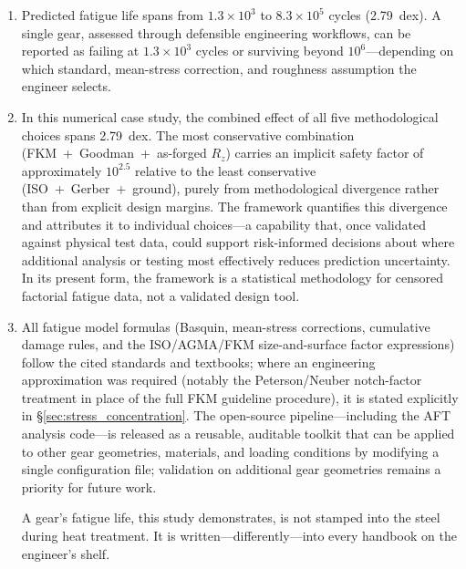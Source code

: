 \documentclass[twocolumn,12pt,a4paper]{article}
\begin{document}
\begin{enumerate}
        constant-amplitude loading; this figure must not be extrapolated
        to variable-amplitude spectra, where sequence effects and
        damage-rule differences could produce substantially larger
        divergence.
  \item Predicted fatigue life spans from $1.3\times10^3$ to
        $8.3\times10^5$ cycles (2.79~dex). A single gear, assessed
        through defensible engineering workflows, can be reported as
        failing at $1.3\times10^3$ cycles or surviving beyond $10^6$---depending on
        which standard, mean-stress correction, and roughness
        assumption the engineer selects.
  \item In this numerical case study, the combined effect of all five
        methodological choices spans 2.79~dex. The most conservative
        combination (FKM~+~Goodman~+~as-forged $R_z$) carries an
        implicit safety factor of approximately $10^{2.5}$ relative to
        the least conservative (ISO~+~Gerber~+~ground), purely from
        methodological divergence rather than from explicit design
        margins. The framework quantifies this divergence and attributes
        it to individual choices---a capability that, once validated
        against physical test data, could support risk-informed
        decisions about where additional analysis or testing most
        effectively reduces prediction uncertainty. In its present
        form, the framework is a statistical methodology for censored
        factorial fatigue data, not a validated design tool.
  \item All fatigue model formulas (Basquin, mean-stress corrections,
        cumulative damage rules, and the ISO/AGMA/FKM size-and-surface
        factor expressions) follow the cited standards and textbooks;
        where an engineering approximation was required (notably the
        Peterson/Neuber notch-factor treatment in place of the full FKM
        guideline procedure), it is stated explicitly in
        \S\ref{sec:stress_concentration}. The open-source pipeline---including
        the AFT analysis code---is released as a reusable, auditable
        toolkit that can be applied to other gear geometries, materials,
        and loading conditions by modifying a single configuration file; validation on
        additional gear geometries remains a priority for future work.

\medskip
\noindent A gear's fatigue life, this study demonstrates, is not stamped
into the steel during heat treatment. It is written---differently---into
every handbook on the engineer's shelf.
\end{enumerate}
\end{document}
